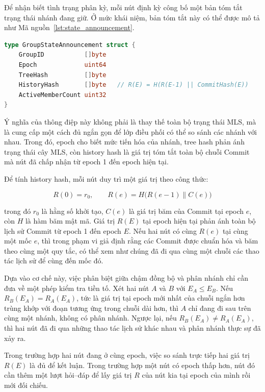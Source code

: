 \documentclass[../DoAn.tex]{subfiles}
\begin{document}
Để nhận biết tình trạng phân kỳ, mỗi nút định kỳ công bố một bản tóm tắt trạng thái nhánh đang giữ. Ở mức khái niệm, bản tóm tắt này có thể được mô tả như Mã nguồn~\ref{lst:state_announcement}.

\begin{lstlisting}[language=Go, caption={Bản tóm tắt trạng thái nhánh dùng cho đối chiếu}, label={lst:state_announcement}]
type GroupStateAnnouncement struct {
    GroupID           []byte
    Epoch             uint64
    TreeHash          []byte
    HistoryHash       []byte   // R(E) = H(R(E-1) || CommitHash(E))
    ActiveMemberCount uint32
}
\end{lstlisting}

Ý nghĩa của thông điệp này không phải là thay thế toàn bộ trạng thái MLS, mà là cung cấp một cách đủ ngắn gọn để lớp điều phối có thể so sánh các nhánh với nhau. Trong đó, epoch cho biết mức tiến hóa của nhánh, tree hash phản ánh trạng thái cây MLS, còn history hash là giá trị tóm tắt toàn bộ chuỗi Commit mà nút đã chấp nhận từ epoch 1 đến epoch hiện tại.

Để tính history hash, mỗi nút duy trì một giá trị theo công thức:

\[
R(0) = r_0, \qquad R(e) = H\bigl(R(e-1) \parallel C(e)\bigr)
\]

trong đó $r_0$ là hằng số khởi tạo, $C(e)$ là giá trị băm của Commit tại epoch $e$, còn $H$ là hàm băm mật mã. Giá trị $R(E)$ tại epoch hiện tại phản ánh toàn bộ lịch sử Commit từ epoch 1 đến epoch $E$. Nếu hai nút có cùng $R(e)$ tại cùng một mốc $e$, thì trong phạm vi giả định rằng các Commit được chuẩn hóa và băm theo cùng một quy tắc, có thể xem như chúng đã đi qua cùng một chuỗi các thao tác lịch sử để cùng đến mốc đó.

Dựa vào cơ chế này, việc phân biệt giữa chậm đồng bộ và phân nhánh chỉ cần đưa về một phép kiểm tra tiền tố. Xét hai nút $A$ và $B$ với $E_A \leq E_B$. Nếu $R_B(E_A) = R_A(E_A)$, tức là giá trị tại epoch mới nhất của chuỗi ngắn hơn trùng khớp với đoạn tương ứng trong chuỗi dài hơn, thì $A$ chỉ đang đi sau trên cùng một nhánh, không có phân nhánh. Ngược lại, nếu $R_B(E_A) \neq R_A(E_A)$, thì hai nút đã đi qua những thao tác lịch sử khác nhau và phân nhánh thực sự đã xảy ra.

Trong trường hợp hai nút đang ở cùng epoch, việc so sánh trực tiếp hai giá trị $R(E)$ là đủ để kết luận. Trong trường hợp một nút có epoch thấp hơn, nút đó cần thêm một lượt hỏi--đáp để lấy giá trị $R$ của nút kia tại epoch của mình rồi mới đối chiếu.
\end{document}
